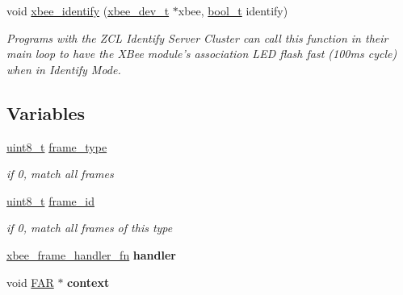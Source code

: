 \begin{DoxyCompactItemize}
void \hyperlink{group__xbee__device_ga42768d8f8aa841ed4f42396cff2815aa}{xbee\-\_\-identify} (\hyperlink{structxbee__dev__t}{xbee\-\_\-dev\-\_\-t} $\ast$xbee, \hyperlink{group__hal_ga04dd5074964518403bf944f2b240a5f8}{bool\-\_\-t} identify)
\begin{DoxyCompactList}\small\item\em Programs with the Z\-C\-L Identify Server Cluster can call this function in their main loop to have the X\-Bee module's association L\-E\-D flash fast (100ms cycle) when in Identify Mode. \end{DoxyCompactList}\end{DoxyCompactItemize}
\subsection*{Variables}
\begin{DoxyCompactItemize}
\item 
\hypertarget{group__xbee__device_gafa34d393db5fa915716b483011415ddc}{\hyperlink{group__hal_gae1affc9ca37cfb624959c866a73f83c2}{uint8\-\_\-t} \hyperlink{group__xbee__device_gafa34d393db5fa915716b483011415ddc}{frame\-\_\-type}}\label{group__xbee__device_gafa34d393db5fa915716b483011415ddc}

\begin{DoxyCompactList}\small\item\em if 0, match all frames \end{DoxyCompactList}\item 
\hypertarget{group__xbee__device_ga03c1016ac46b9df250b994f242cf956a}{\hyperlink{group__hal_gae1affc9ca37cfb624959c866a73f83c2}{uint8\-\_\-t} \hyperlink{group__xbee__device_ga03c1016ac46b9df250b994f242cf956a}{frame\-\_\-id}}\label{group__xbee__device_ga03c1016ac46b9df250b994f242cf956a}

\begin{DoxyCompactList}\small\item\em if 0, match all frames of this type \end{DoxyCompactList}\item 
\hypertarget{group__xbee__device_gacae6128cc991ffaa526063adc6dd9fe8}{\hyperlink{group__xbee__device_ga3d8f20fa50d6f72eaf03f0cdd4c9832b}{xbee\-\_\-frame\-\_\-handler\-\_\-fn} {\bfseries handler}}\label{group__xbee__device_gacae6128cc991ffaa526063adc6dd9fe8}

\item 
\hypertarget{group__xbee__device_gaa91f8e864e06077c354e5f5216547758}{void \hyperlink{group__hal_gaef060b3456fdcc093a7210a762d5f2ed}{F\-A\-R} $\ast$ {\bfseries context}}\label{group__xbee__device_gaa91f8e864e06077c354e5f5216547758}


\end{DoxyCompactItemize}
